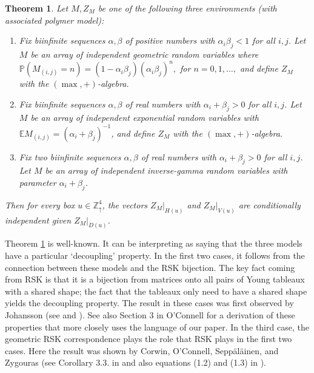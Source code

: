 \documentclass[aop, preprint]{imsart}
\theoremstyle{plain}
\newtheorem{theorem}{Theorem}[section]
\theoremstyle{definition}
\theoremstyle{plain}
\newcommand{\p}{\mathbb{P}}
\newcommand{\expt}{\mathbb{E}}
\newcommand{\al}{\alpha}
\newcommand{\be}{\beta}
\newcommand{\Zd}{\mathds{Z}^4_\uparrow}
\begin{document}
\begin{theorem}
	\label{T:explicit}
	Let $M, Z_M$ be one of the following three environments (with associated polymer model):
	\begin{enumerate}[label=(\roman*)]
		\item Fix biinfinite sequences $\al, \be$ of positive numbers with $\al_i\be_j < 1$ for all $i, j$. Let $M$ be an array of independent geometric random variables where
		$
		\p(M_{(i, j)} = n) = (1 - \al_i \be_j)(\al_i \be_j)^n,
		$
		for $n =0, 1, \dots,$ and define $Z_M$ with the $(\max, +)$-algebra.
		\item Fix biinfinite sequences $\al, \be$ of real numbers with $\al_i + \be_j > 0$ for all $i, j$. Let $M$ be an array of independent exponential random variables with $\expt M_{(i, j)} = (\al_i + \be_j)^{-1}$,
		and define $Z_M$ with the $(\max, +)$-algebra.
		\item Fix two biinfinite sequences $\al, \be$ of real numbers with $\al_i + \be_j > 0$ for all $i, j$. Let $M$ be an array of independent inverse-gamma random variables with parameter $\al_i + \be_j$.
	\end{enumerate}
	Then for every box $u \in \Zd$, the vectors $Z_M|_{H(u)}$ and $Z_M|_{V(u)}$ are conditionally independent given $Z_M|_{D(u)}$.
\end{theorem}

Theorem \ref{T:explicit} is well-known. It can be interpreting as saying that the three models have a particular `decoupling' property.
 In the first two cases, it follows from the connection between these models and the RSK bijection. The key fact coming from RSK is that it is a bijection from matrices onto all pairs of Young tableaux with a shared shape; the fact that the tableaux only need to have a shared shape yields the decoupling property. The result in these cases was first observed by Johansson (see \citep{johansson2003discrete} and \citep{johansson2000shape}). See also Section 3 in O'Connell \cite{o2003conditioned} for a derivation of these properties that more closely uses the language of our paper. In the third case, the geometric RSK correspondence plays the role that RSK plays in the first two cases. Here the result was shown by Corwin, O'Connell, Sepp\"al\"ainen, and Zygouras (see Corollary 3.3. in \citep{o2014geometric} and also equations (1.2) and (1.3) in \citep{corwin2014tropical}). 
\end{document}
